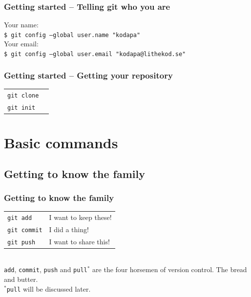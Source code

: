 \documentclass{beamer}
\begin{document}
\begin{frame}[fragile]
  \frametitle{Getting started -- Telling git who you are}

  Your name:\\
  \texttt{\$ git config --global user.name "kodapa"} \\[1em]

  Your email:\\
  \texttt{\$ git config --global user.email "kodapa@lithekod.se"} \\

\end{frame}

\begin{frame}[fragile]
  \frametitle{Getting started -- Getting your repository}
  \begin{tabular}{ll}
    \texttt{git clone} & \\
    \texttt{git init} & \\
  \end{tabular}
\end{frame}


\section{Basic commands}
\subsection{Getting to know the family}


\begin{frame}[fragile]
  \frametitle{Getting to know the family}

  \begin{tabular}{ll}
    \texttt{git add} & I want to keep these! \\
    \texttt{git commit} & I did a thing! \\
    \texttt{git push} & I want to share this! \\ %
  \end{tabular}
  \\ [2.0em]

  \texttt{add}, \texttt{commit}, \texttt{push} and \texttt{pull}$^*$
  are the four horsemen of version control. The bread and butter.
  \\ [2.0em]

  \small $^*$\texttt{pull} will be discussed later.

\end{frame}
\end{document}
